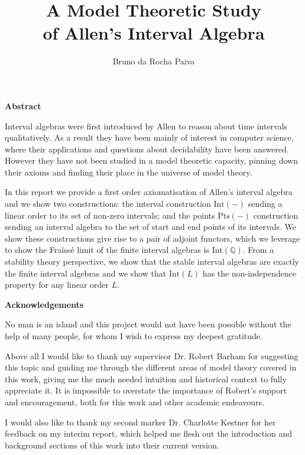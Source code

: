 \documentclass[11pt %
              ]{article}
\title{A Model Theoretic Study \\ of Allen's Interval Algebra}
\author{Bruno da Rocha Paiva}
\date{} %
\newcommand{\Q}{\mathbb{Q}}
\newcommand{\inter}[1][-]{\text{Int}\left(#1\right)}
\newcommand{\points}[1][-]{\text{Pts}\left(#1\right)}
\theoremstyle{plain}
\theoremstyle{definition}
\theoremstyle{remark}
\begin{document}
\pagestyle{empty}



\newpage
\hspace{0pt}
\vfill
\begin{center}
    \textbf{Abstract}
\end{center}
Interval algebras were first introduced by Allen to reason about time intervals qualitatively. As
a result they have been mainly of interest in computer science, where their applications and
questions about decidability have been answered. However they have not been studied in a
model theoretic capacity, pinning down their axioms and finding their place in the universe of model
theory.

In this report we provide a first order axiomatisation of Allen's interval algebra and we show
two constructions: the interval construction $\inter$ sending a linear order to its set of non-zero
intervals; and the points $\points$ construction sending an interval algebra to the set of start and end
points of its intervals. We show these constructions give rise to a pair of adjoint functors,
which we leverage to show the Fraïssé limit of the finite interval algebras is $\inter[\Q]$. From a
stability theory perspective, we show that the stable interval algebras are exactly the finite
interval algebras and we show that $\inter[L]$ has the non-independence property for any linear
order $L$.
\vfill
\hspace{0pt}

\newpage
\hspace{0pt}
\vfill
\begin{center}
    \textbf{Acknowledgements}
\end{center}
No man is an island and this project would not have been possible without the help of many people,
for whom I wish to express my deepest gratitude.

Above all I would like to thank my supervisor Dr. Robert Barham for suggesting this topic and
guiding me through the different areas of model theory covered in this work, giving me the much
needed intuition and historical context to fully appreciate it. It is impossible
to overstate the importance of Robert's support and encouragement, both for this work and other
academic endeavours.

I would also like to thank my second marker Dr. Charlotte Kestner for her feedback on my interim
report, which helped me flesh out the introduction and background sections of this work into their
current version.
\end{document}
